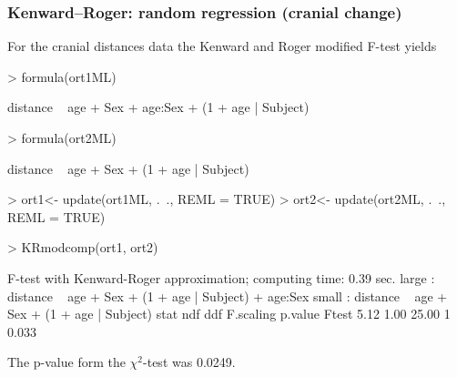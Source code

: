 \begin{sframe}
  \frametitle{Kenward--Roger:  random regression (cranial change)}
For the cranial distances  data the
Kenward and Roger modified F-test yields
\begin{Schunk}
\begin{Sinput}
> formula(ort1ML)
\end{Sinput}
\begin{Soutput}
distance ~ age + Sex + age:Sex + (1 + age | Subject)
\end{Soutput}
\begin{Sinput}
> formula(ort2ML)
\end{Sinput}
\begin{Soutput}
distance ~ age + Sex + (1 + age | Subject)
\end{Soutput}
\begin{Sinput}
> ort1<- update(ort1ML, .~., REML = TRUE)
> ort2<- update(ort2ML, .~., REML = TRUE)
\end{Sinput}
\end{Schunk}
\end{sframe}

\begin{sframe}
\begin{Schunk}
\begin{Sinput}
> KRmodcomp(ort1, ort2)
\end{Sinput}
\begin{Soutput}
F-test with Kenward-Roger approximation; computing time: 0.39 sec.
large : distance ~ age + Sex + (1 + age | Subject) + age:Sex
small : distance ~ age + Sex + (1 + age | Subject)
       stat   ndf   ddf F.scaling p.value
Ftest  5.12  1.00 25.00         1   0.033
\end{Soutput}
\end{Schunk}
The p-value form the  $\chi^2$-test was 0.0249.

\end{sframe}


